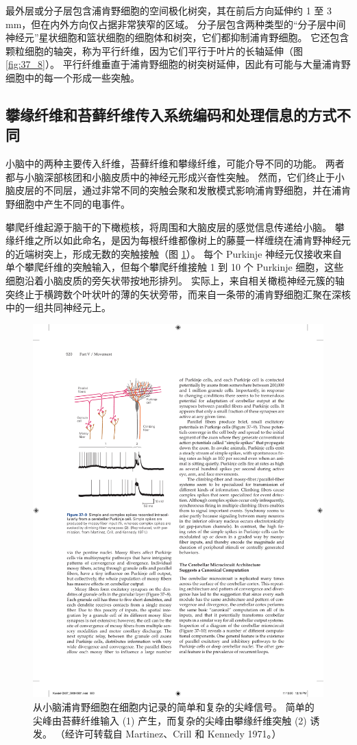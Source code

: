 最外层或分子层包含浦肯野细胞的空间极化树突，其在前后方向延伸约 1 至 3 mm，但在内外方向仅占据非常狭窄的区域。 分子层包含两种类型的“分子层中间神经元”星状细胞和篮状细胞的细胞体和树突，它们都抑制浦肯野细胞。 它还包含颗粒细胞的轴突，称为平行纤维，因为它们平行于叶片的长轴延伸（图 \ref{fig:37_8}）。 平行纤维垂直于浦肯野细胞的树突树延伸，因此有可能与大量浦肯野细胞中的每一个形成一些突触。

\subsection{攀缘纤维和苔藓纤维传入系统编码和处理信息的方式不同}
小脑中的两种主要传入纤维，苔藓纤维和攀缘纤维，可能介导不同的功能。 两者都与小脑深部核团和小脑皮质中的神经元形成兴奋性突触。 然而，它们终止于小脑皮层的不同层，通过非常不同的突触会聚和发散模式影响浦肯野细胞，并在浦肯野细胞中产生不同的电事件。

攀爬纤维起源于脑干的下橄榄核，将周围和大脑皮层的感觉信息传递给小脑。 
攀缘纤维之所以如此命名，是因为每根纤维都像树上的藤蔓一样缠绕在浦肯野神经元的近端树突上，形成无数的突触接触（图 \ref{fig:37_9}）。 
每个 Purkinje 神经元仅接收来自单个攀爬纤维的突触输入，但每个攀爬纤维接触 1 到 10 个 Purkinje 细胞，这些细胞沿着小脑皮质的旁矢状带按地形排列。 实际上，来自相关橄榄神经元簇的轴突终止于横跨数个叶状叶的薄的矢状旁带，而来自一条带的浦肯野细胞汇聚在深核中的一组共同神经元上。

\begin{figure}[htbp]
	\centering
	\includegraphics[width=0.45\linewidth]{chap37/fig_37_9}
	\caption{从小脑浦肯野细胞在细胞内记录的简单和复杂的尖峰信号。 简单的尖峰由苔藓纤维输入 (1) 产生，而复杂的尖峰由攀缘纤维突触 (2) 诱发。 （经许可转载自 Martinez、Crill 和 Kennedy 1971。）}
	\label{fig:37_9}
\end{figure}

